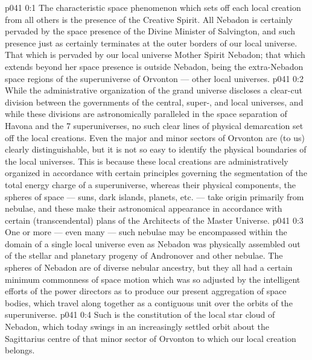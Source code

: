 \author{Archangel\ts{*}}
\vs p041 0:1 The characteristic space phenomenon which sets off each local creation from all others is the presence of the Creative Spirit. All Nebadon is certainly pervaded by the space presence of the Divine Minister of Salvington, and such presence just as certainly terminates at the outer borders of our local universe. That which is pervaded by our local universe Mother Spirit  Nebadon; that which extends beyond her space presence is outside Nebadon, being the extra\hyp{}Nebadon space regions of the superuniverse of Orvonton --- other local universes.
\vs p041 0:2 \pc While the administrative organization of the grand universe discloses a clear\hyp{}cut division between the governments of the central, super-, and local universes, and while these divisions are astronomically paralleled in the space separation of Havona and the 7 superuniverses, no such clear lines of physical demarcation set off the local creations. Even the major and minor sectors of Orvonton are (to us) clearly distinguishable, but it is not so easy to identify the physical boundaries of the local universes. This is because these local creations are administratively organized in accordance with certain  principles governing the segmentation of the total energy charge of a superuniverse, whereas their physical components, the spheres of space --- suns, dark islands, planets, etc. --- take origin primarily from nebulae, and these make their astronomical appearance in accordance with certain  (transcendental) plans of the Architects of the Master Universe.
\vs p041 0:3 One or more --- even many --- such nebulae may be encompassed within the domain of a single local universe even as Nebadon was physically assembled out of the stellar and planetary progeny of Andronover and other nebulae. The spheres of Nebadon are of diverse nebular ancestry, but they all had a certain minimum commonness of space motion which was so adjusted by the intelligent efforts of the power directors as to produce our present aggregation of space bodies, which travel along together as a contiguous unit over the orbits of the superuniverse.
\vs p041 0:4 Such is the constitution of the local star cloud of Nebadon, which today swings in an increasingly settled orbit about the Sagittarius centre of that minor sector of Orvonton to which our local creation belongs.
